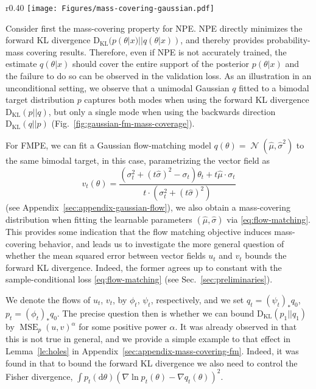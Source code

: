 \documentclass{article}
\theoremstyle{remark}
\renewcommand{\d}{\mathrm{d}}
\newcommand{\KL}{\mathrm{D_{KL}}}
\DeclareMathOperator{\MSE}{MSE}
\DeclareMathOperator{\N}{\mathcal{N}}
\begin{document}
\begin{wrapfigure}{r}{0.40\textwidth}
  \vspace{-5pt}
  \centering
  \texttt{[image: Figures/mass-covering-gaussian.pdf]}
  \vspace{-3pt}
  \caption{\label{fig:gaussian-fm-mass-coverage}
  A Gaussian (blue) fitted to a bimodal distribution (gray) with various objectives.
  }
  \vspace{-5pt}
\end{wrapfigure}
Consider first the mass-covering property for NPE. NPE directly minimizes the forward KL divergence $\KL(p(\theta|x)||q(\theta|x))$, and thereby provides probability-mass covering results. Therefore, even if NPE is not accurately trained, the estimate  $q(\theta|x)$ should cover the entire support of the posterior $p(\theta|x)$ and the failure to do so can be observed in the validation loss. As an illustration in an unconditional setting, we observe that a unimodal Gaussian $q$ fitted to a bimodal target distribution $p$ captures both modes when using the forward KL divergence $\KL(p||q)$, but only a single mode when using the backwards direction $\KL(q||p)$ (Fig.~\ref{fig:gaussian-fm-mass-coverage}).

For FMPE, we can fit a Gaussian flow-matching model $q(\theta)=\N(\hat\mu,\hat\sigma^2)$ to the same bimodal target, in this case, parametrizing the vector field as 
\begin{equation}\label{eq:ut-for-gaussian-flow}
v_t(\theta) = \frac{(\sigma_t^2 + (t\hat\sigma)^2 -\sigma_t)\theta_t + t\hat\mu\cdot\sigma_t}{t\cdot(\sigma_t^2 + (t\hat\sigma)^2)}    
\end{equation}
(see Appendix~\ref{sec:appendix-gaussian-flow}), we also obtain a mass-covering distribution when fitting the learnable parameters $(\hat\mu,\hat\sigma)$ via \eqref{eq:flow-matching}. %
This provides some indication that the flow matching objective induces mass-covering behavior, and leads us to investigate the more general question of whether the mean squared error between vector fields $u_t$
 and $v_t$  bounds the forward KL divergence. Indeed, the former agrees up to constant with the sample-conditional loss \eqref{eq:flow-matching} (see Sec.~\ref{sec:preliminaries}).

We  denote the flows of $u_t$, $v_t$, by $\phi_t$, $\psi_t$, respectively, and we set $q_t=(\psi_t)_\ast q_0$, $p_t=(\phi_t)_\ast q_0$. The precise question then is whether we can bound $\KL(p_1||q_1)$ by $\MSE_{p}(u, v)^\alpha$ for some positive power $\alpha$. It was already observed in \cite{albergo2023stochastic} that this is not true in general, and we provide a simple example to that effect in Lemma~\ref{le:holes} in Appendix~\ref{sec:appendix-mass-covering-fm}. Indeed, it was found in \cite{albergo2023stochastic} that to bound the forward KL divergence we also need to control the Fisher divergence, 
 $\int p_t(\d \theta) (\nabla \ln p_t(\theta)-\nabla q_t(\theta))^2$.
 
\end{document}
